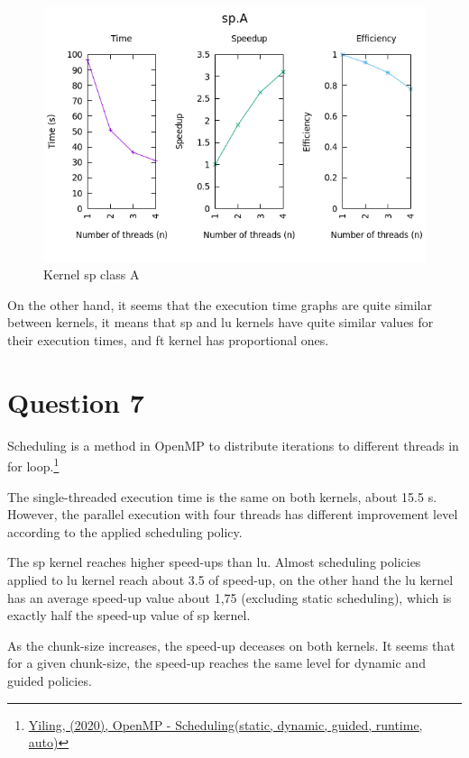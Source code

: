 \documentclass[12pt]{article}
\begin{document}
\begin{figure}[h!]
	\centering
	\includegraphics[width=0.9\linewidth]{sp.A.PTSE.png}
	\caption{Kernel sp class A}
	\label{fig:spa}
\end{figure}

On the other hand, it seems that the execution time graphs are quite similar between kernels, it means that sp and lu kernels have quite similar values for their execution times, and ft kernel has proportional ones.

\newpage

\section*{Question 7}

Scheduling is a method in OpenMP to distribute iterations to different threads in for loop.\footnote{\href{https://610yilingliu.github.io/2020/07/15/ScheduleinOpenMP/}{Yiling, (2020), OpenMP - Scheduling(static, dynamic, guided, runtime, auto)}}


The single-threaded execution time is the same on both kernels, about 15.5 s. However, the parallel execution with four threads has different improvement level according to the applied scheduling policy.

The sp kernel reaches higher speed-ups than lu. Almost scheduling policies applied to lu kernel reach about 3.5 of speed-up, on the other hand the lu kernel has an average speed-up value about 1,75 (excluding static scheduling), which is exactly half the speed-up value of sp kernel.

As the chunk-size increases, the speed-up deceases on both kernels. It seems that for a given chunk-size, the speed-up reaches the same level for dynamic and guided policies.
\end{document}
